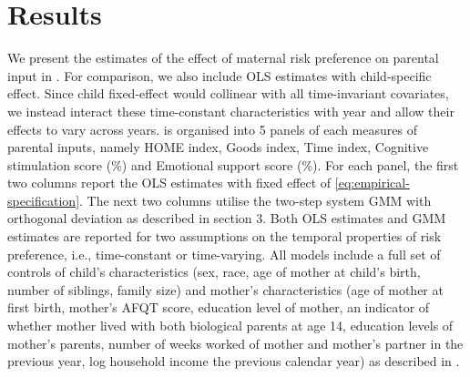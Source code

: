 \documentclass[emulatestandardclasses, 10pt, abstract = true]{scrartcl}
\begin{document}
\section{Results}
We present the estimates of the effect of maternal risk preference on parental input in . For comparison, we also include OLS estimates with child-specific effect. Since child fixed-effect would collinear with all time-invariant covariates, we instead interact these time-constant characteristics with year and allow their effects to vary across years.  is organised into 5 panels of each measures of parental inputs, namely HOME index, Goods index, Time index, Cognitive stimulation score (\%) and Emotional support score (\%). For each panel, the first two columns report the OLS estimates with fixed effect of \eqref{eq:empirical-specification}. The next two columns utilise the two-step system GMM with orthogonal deviation as described in section 3. Both OLS estimates and GMM estimates are reported for two assumptions on the temporal properties of risk preference, i.e., time-constant or time-varying. All models include a full set of controls of child's characteristics (sex, race, age of mother at child's birth, number of siblings, family size) and mother's characteristics (age of mother at first birth, mother's AFQT score, education level of mother, an indicator of whether mother lived with both biological parents at age 14, education levels of mother's parents, number of weeks worked of mother and mother's partner in the previous year, log household income the previous calendar year) as described in .  
\end{document}
